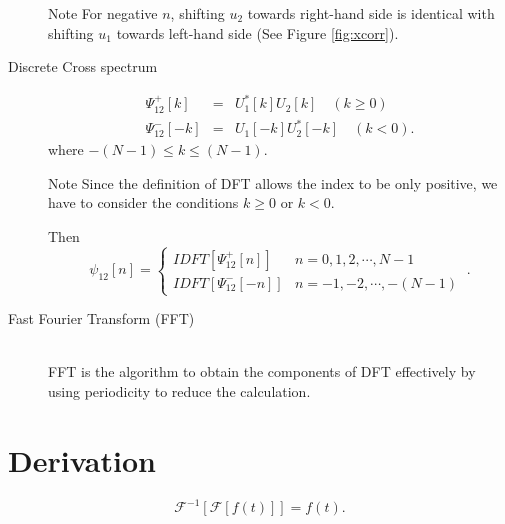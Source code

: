 \documentclass{proposal}
\begin{document}
\begin{description}
\begin{itembox}[l]{Note}
For negative $n$, shifting $u_2$ towards right-hand side is identical with shifting $u_1$ towards left-hand side (See Figure \ref{fig:xcorr}).
\end{itembox}

\item[Discrete Cross spectrum]
\begin{eqnarray}
\Psi_{12}^{+}[k] &=& U_1^*[k]U_2[k] \quad (k \geq 0)\\
\Psi_{12}^{-}[-k] &=& U_1[-k]U_2^*[-k] \quad (k < 0).
\end{eqnarray}
where $-(N-1) \leq k \leq (N-1)$.
\begin{itembox}[l]{Note}
Since the definition of DFT allows the index to be only positive, we have to consider the conditions $k\geq0$ or $k<0$.
\end{itembox}

Then
\begin{equation}
\psi_{12}[n] = \begin{cases}
IDFT[\Psi_{12}^{+}[n]] & n = 0,1,2, \cdots, N-1\\
IDFT[\Psi_{12}^{-}[-n]] & n = -1,-2, \cdots, -(N-1)\
\end{cases}.
\end{equation}

\item[Fast Fourier Transform (FFT)] ~
\\FFT is the algorithm to obtain the components of DFT effectively by using periodicity to reduce the calculation.

\end{description}


\section{Derivation}
\begin{lemma}
\begin{equation}
\mathcal{F}^{-1}[\mathcal{F}[f(t)]] = f(t).
\end{equation}
\end{lemma}
\end{document}
